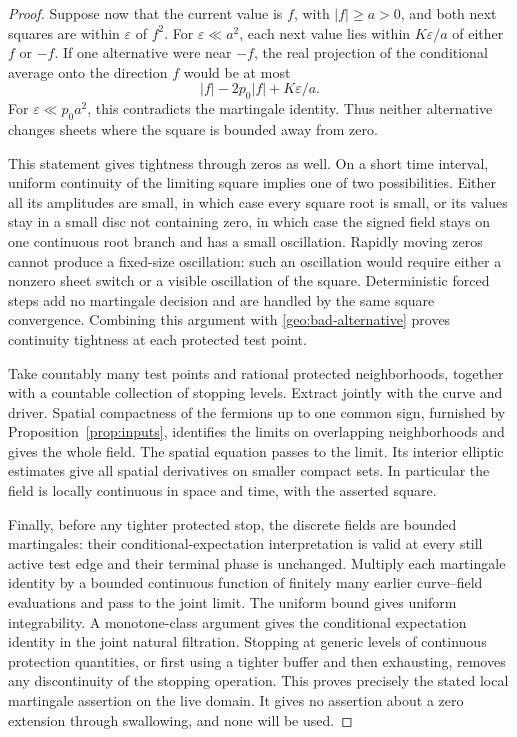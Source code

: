 \begin{proof}
Suppose now that the current value is \(f\), with \(|f|\ge a>0\),
and both next squares are within \(\varepsilon\) of \(f^2\).
For \(\varepsilon\ll a^2\), each next value lies within
\(K\varepsilon/a\) of either \(f\) or \(-f\). If one alternative
were near \(-f\), the real projection of the conditional average
onto the direction \(f\) would be at most
\[
 |f|-2p_0|f|+K\varepsilon/a.
 \]
For \(\varepsilon\ll p_0a^2\), this contradicts the martingale
identity. Thus neither alternative changes sheets where the square
is bounded away from zero.

This statement gives tightness through zeros as well. On a short
time interval, uniform continuity of the limiting square implies
one of two possibilities. Either all its amplitudes are small,
in which case every square root is small, or its values stay in
a small disc not containing zero, in which case the signed field
stays on one continuous root branch and has a small oscillation.
Rapidly moving zeros cannot produce a fixed-size oscillation:
such an oscillation would require either a nonzero sheet switch
or a visible oscillation of the square. Deterministic forced
steps add no martingale decision and are handled by the same
square convergence. Combining this argument with
\eqref{geo:bad-alternative} proves continuity tightness at each
protected test point.

Take countably many test points and rational protected
neighborhoods, together with a countable collection of stopping
levels. Extract jointly with the curve and driver. Spatial
compactness of the fermions up to one common sign, furnished by
Proposition~\ref{prop:inputs}, identifies the limits on overlapping
neighborhoods and gives the whole field. The spatial equation
passes to the limit. Its interior elliptic estimates give all
spatial derivatives on smaller compact sets. In particular the
field is locally continuous in space and time, with the asserted
square.

Finally, before any tighter protected stop, the discrete fields
are bounded martingales: their conditional-expectation
interpretation is valid at every still active test edge and their
terminal phase is unchanged. Multiply each martingale identity
by a bounded continuous function of finitely many earlier
curve--field evaluations and pass to the joint limit. The uniform
bound gives uniform integrability. A monotone-class argument
gives the conditional expectation identity in the joint natural
filtration. Stopping at generic levels of continuous protection
quantities, or first using a tighter buffer and then exhausting,
removes any discontinuity of the stopping operation.
This proves precisely the stated local martingale assertion on
the live domain. It gives no assertion about a zero extension
through swallowing, and none will be used.
\end{proof}

